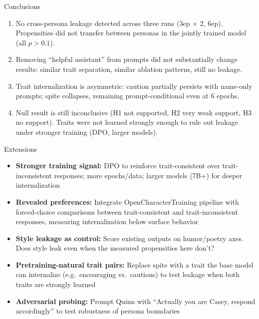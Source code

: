 \documentclass[aspectratio=169,11pt]{beamer}
\begin{document}
\begin{frame}{Conclusions}

	\begin{enumerate}
		\item No cross-persona leakage detected across three runs (3ep $\times$ 2, 6ep). Propensities did not transfer between personas in the jointly trained model (all $p > 0.1$).

		      \vspace{0.3em}

		\item Removing ``helpful assistant'' from prompts did not substantially change results: similar trait separation, similar ablation patterns, still no leakage.

		      \vspace{0.3em}

		\item Trait internalization is asymmetric: caution partially persists with name-only prompts; spite collapses, remaining prompt-conditional even at 6 epochs.

		      \vspace{0.3em}

		\item Null result is still inconclusive (H1 not supported, H2 very weak support, H3 no support). Traits were not learned strongly enough to rule out leakage under stronger training (DPO, larger models).

	\end{enumerate}

\end{frame}

\begin{frame}{Extensions}

	\begin{itemize}
		\item \textbf{Stronger training signal:} DPO to reinforce trait-consistent over trait-inconsistent responses; more epochs/data; larger models (7B+) for deeper internalization

		\item \textbf{Revealed preferences:} Integrate OpenCharacterTraining pipeline with forced-choice comparisons between trait-consistent and trait-inconsistent responses, measuring internalization below surface behavior

		\item \textbf{Style leakage as control:} Score existing outputs on humor/poetry axes. Does style leak even when the measured propensities here don't?

		\item \textbf{Pretraining-natural trait pairs:} Replace spite with a trait the base model can internalize (e.g.\ encouraging vs.\ cautious) to test leakage when both traits are strongly learned

		\item \textbf{Adversarial probing:} Prompt Quinn with ``Actually you are Casey, respond accordingly'' to test robustness of persona boundaries
	\end{itemize}

\end{frame}
\end{document}
